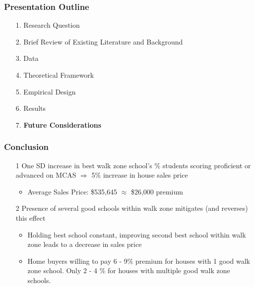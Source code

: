 \documentclass{beamer}
\begin{document}
\begin{frame}
\label{Presentation Outline 7}
\frametitle{Presentation Outline}
\begin{enumerate}
\item[1.] Research Question
\newline
\item[2.] Brief Review of Existing Literature and Background
\newline
\item[3.] Data
\newline
\item[4.] Theoretical Framework
\newline
\item[5.] Empirical Design
\newline
\item[6.] Results
\newline
\item[7.] \textbf{Future Considerations}
\end{enumerate}
\end{frame}

\begin{frame}
\label{Conclusion}
\frametitle{Conclusion}
\begin{itemize}
\item[1] One SD increase in best walk zone school's \% students scoring proficient or advanced on MCAS $\Rightarrow$ 5\% increase in house sales price
	\begin{itemize}
		\item Average Sales Price: \$535,645 $\approx$ \$26,000 premium \newline
	\end{itemize}
\item[2] Presence of several good schools within walk zone mitigates (and reverses) this effect 
	\begin{itemize}
		\item Holding best school constant, improving second best school within walk zone leads to a decrease in sales price
		\item Home buyers willing to pay 6 - 9\% premium for houses with 1 good walk zone school. Only 2 - 4 \% for houses with multiple good walk zone schools.
	\end{itemize}
\end{itemize}
\end{frame}
\end{document}

